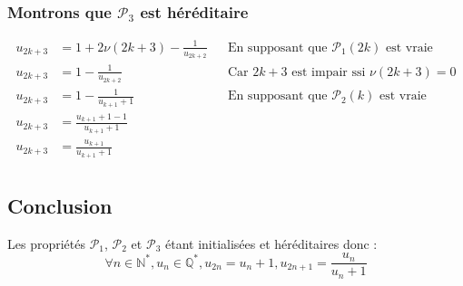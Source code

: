 \documentclass{exam}
\newcommand*{\p}{\mathcal{P}}
\newcommand*{\QS}{\mathbb{Q}^*}
\begin{document}
\subsubsection{Montrons que $\p_3$ est héréditaire}
\begin{align*}
u_{2k+3}&=1+2\nu(2k+3)-\frac{1}{u_{2k+2}}
&&\text{En supposant que $\p_1(2k)$ est vraie}
\\
u_{2k+3}&=1-\frac{1}{u_{2k+2}}
&&\text{Car $2k+3$ est impair ssi $\nu(2k+3)=0$}
\\
u_{2k+3}&=1-\frac{1}{u_{k+1}+1}
&&\text{En supposant que $\p_2(k)$ est vraie}
\\
u_{2k+3}&=\frac{u_{k+1}+1-1}{u_{k+1}+1}
\\
u_{2k+3}&=\frac{u_{k+1}}{u_{k+1}+1}
\\
\end{align*}

\subsection{Conclusion}
Les propriétés $\p_1$, $\p_2$ et $\p_3$ étant initialisées et héréditaires donc :
$$
\forall n \in \mathbb{N}^*,
u_n \in \QS,
u_{2n}=u_n+1,
u_{2n+1}=\frac{u_n}{u_n+1}
$$
\end{document}
